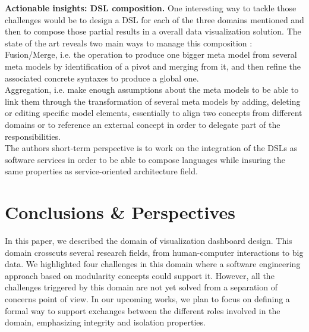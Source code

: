 \documentclass{acm_proc_article-sp}
\begin{document}
\textbf{Actionable insights: DSL composition.}
One interesting way to tackle those challenges would be to design a
DSL for each of the three domains mentioned and then to compose those
partial results in a overall data visualization solution.
The state of the art reveals two main ways to manage this composition :\\
 Fusion/Merge, i.e. the operation to produce one bigger meta
model from several meta models by identification of a pivot and
merging from it, and
then refine the associated concrete syntaxes to produce a global one.\cite{kienzle13}\\
 Aggregation, i.e. make enough assumptions about the meta models
to be able to link them through the transformation of several meta models
by adding, deleting or editing specific model elements, essentially to align
two concepts from different domains or to reference an external concept
in order to delegate part of the responsibilities. \cite{blouin14}\\
The authors short-term perspective is to work on the integration of
the DSLs as software services in order to be able to compose languages
while insuring the same properties as service-oriented architecture
field.

\section{Conclusions \& Perspectives}
In this paper, we described the domain of visualization dashboard
design. This domain crosscuts several research fields, from
human-computer interactions to big data. We highlighted four
challenges in this domain where a software engineering approach based
on modularity concepts could support it. However, all the challenges
triggered by this domain are not yet solved from a separation of
concerns point of view. In our upcoming works, we plan to focus on
defining a formal way to support exchanges between the different roles
involved in the domain, emphasizing integrity and isolation
properties.




%
\end{document}

